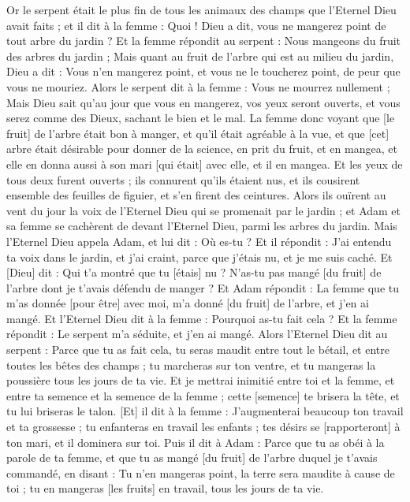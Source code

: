 \begin{multicols}{2}
\VerseOne{}Or le serpent était le plus fin de tous les animaux des champs que l'Eternel Dieu avait faits ; et il dit à la femme : Quoi ! Dieu a dit, vous ne mangerez point de tout arbre du jardin ?
Et la femme répondit au serpent : Nous mangeons du fruit des arbres du jardin ;
Mais quant au fruit de l'arbre qui est au milieu du jardin, Dieu a dit : Vous n'en mangerez point, et vous ne le toucherez point, de peur que vous ne mouriez.
Alors le serpent dit à la femme : Vous ne mourrez nullement ;
Mais Dieu sait qu'au jour que vous en mangerez, vos yeux seront ouverts, et vous serez comme des Dieux, sachant le bien et le mal.
La femme donc voyant que [le fruit] de l'arbre était bon à manger, et qu'il était agréable à la vue, et que [cet] arbre était désirable pour donner de la science, en prit du fruit, et en mangea, et elle en donna aussi à son mari [qui était] avec elle, et il en mangea.
Et les yeux de tous deux furent ouverts ; ils connurent qu'ils étaient nus, et ils cousirent ensemble des feuilles de figuier, et s'en firent des ceintures.
Alors ils ouïrent au vent du jour la voix de l'Eternel Dieu qui se promenait par le jardin ; et Adam et sa femme se cachèrent de devant l'Eternel Dieu, parmi les arbres du jardin.
Mais l'Eternel Dieu appela Adam, et lui dit : Où es-tu ?
Et il répondit : J'ai entendu ta voix dans le jardin, et j'ai craint, parce que j'étais nu, et je me suis caché.
Et [Dieu] dit : Qui t'a montré que tu [étais] nu ? N'as-tu pas mangé [du fruit] de l'arbre dont je t'avais défendu de manger ?
Et Adam répondit : La femme que tu m'as donnée [pour être] avec moi, m'a donné [du fruit] de l'arbre, et j'en ai mangé.
Et l'Eternel Dieu dit à la femme : Pourquoi as-tu fait cela ? Et la femme répondit : Le serpent m'a séduite, et j'en ai mangé.
Alors l'Eternel Dieu dit au serpent : Parce que tu as fait cela, tu seras maudit entre tout le bétail, et entre toutes les bêtes des champs ; tu marcheras sur ton ventre, et tu mangeras la poussière tous les jours de ta vie.
Et je mettrai inimitié entre toi et la femme, et entre ta semence et la semence de la femme ; cette [semence] te brisera la tête, et tu lui briseras le talon.
[Et] il dit à la femme : J'augmenterai beaucoup ton travail et ta grossesse ; tu enfanteras en travail les enfants ; tes désirs se [rapporteront] à ton mari, et il dominera sur toi.
Puis il dit à Adam : Parce que tu as obéi à la parole de ta femme, et que tu as mangé [du fruit] de l'arbre duquel je t'avais commandé, en disant : Tu n'en mangeras point, la terre sera maudite à cause de toi ; tu en mangeras [les fruits] en travail, tous les jours de ta vie.

\end{multicols}
